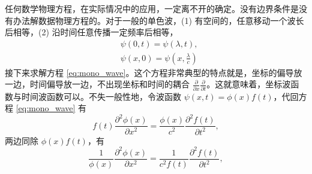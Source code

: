 任何数学物理方程，在实际情况中的应用，一定离不开的确定。没有边界条件是没有办法解数据物理方程的。对于一般的单色波，(1) 有空间的，任意移动一个波长后相等，(2) 沿时间任意传播一定频率后相等，
\begin{align}
    &\psi(0,t) = \psi(\lambda, t), \label{eq:mono_wave_periodical}\\
    &\psi(x,0) = \psi\left(x,\tfrac\lambda{c}\right) \label{eq:mono_wave_freq}
\end{align}
接下来求解方程 \eqref{eq:mono_wave}。这个方程非常典型的特点就是，坐标的偏导放一边，时间偏导放一边，不出现坐标和时间的耦合 $\frac{\partial}{\partial x}\frac{\partial}{\partial t}$。这就意味着，坐标波函数与时间波函数可以。不失一般性地，令波函数 $\psi (x,t) = \phi(x) f(t)$，代回方程 \eqref{eq:mono_wave} 有
\begin{equation}
    f(t) \frac{\partial^2 \phi(x)}{\partial x^2} = \frac{\phi(x)}{c^2} \frac{\partial^2 f(t)}{\partial t^2},
\end{equation}
两边同除 $\phi(x) f(t)$，有
\begin{equation}
    \frac1{\phi(x)} \frac{\partial^2 \phi(x)}{\partial x^2} = \frac{1}{c^2 f(t)} \frac{\partial^2 f(t)}{\partial t^2},
\end{equation}


